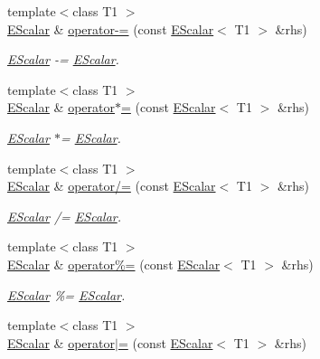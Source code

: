 \begin{DoxyCompactItemize}
{\footnotesize template$<$class T1 $>$ }\\\mbox{\hyperlink{classENSEM_1_1EScalar}{E\+Scalar}} \& \mbox{\hyperlink{classENSEM_1_1EScalar_a2ed33688ab765d0e4d15b391b3f61f33}{operator-\/=}} (const \mbox{\hyperlink{classENSEM_1_1EScalar}{E\+Scalar}}$<$ T1 $>$ \&rhs)
\begin{DoxyCompactList}\small\item\em \mbox{\hyperlink{classENSEM_1_1EScalar}{E\+Scalar}} -\/= \mbox{\hyperlink{classENSEM_1_1EScalar}{E\+Scalar}}. \end{DoxyCompactList}\item 
{\footnotesize template$<$class T1 $>$ }\\\mbox{\hyperlink{classENSEM_1_1EScalar}{E\+Scalar}} \& \mbox{\hyperlink{classENSEM_1_1EScalar_aa614bef8258a8ea3c2711c4d7d032c1a}{operator$\ast$=}} (const \mbox{\hyperlink{classENSEM_1_1EScalar}{E\+Scalar}}$<$ T1 $>$ \&rhs)
\begin{DoxyCompactList}\small\item\em \mbox{\hyperlink{classENSEM_1_1EScalar}{E\+Scalar}} $\ast$= \mbox{\hyperlink{classENSEM_1_1EScalar}{E\+Scalar}}. \end{DoxyCompactList}\item 
{\footnotesize template$<$class T1 $>$ }\\\mbox{\hyperlink{classENSEM_1_1EScalar}{E\+Scalar}} \& \mbox{\hyperlink{classENSEM_1_1EScalar_a09524cf0f6f5baf9c421d03df58fe8d6}{operator/=}} (const \mbox{\hyperlink{classENSEM_1_1EScalar}{E\+Scalar}}$<$ T1 $>$ \&rhs)
\begin{DoxyCompactList}\small\item\em \mbox{\hyperlink{classENSEM_1_1EScalar}{E\+Scalar}} /= \mbox{\hyperlink{classENSEM_1_1EScalar}{E\+Scalar}}. \end{DoxyCompactList}\item 
{\footnotesize template$<$class T1 $>$ }\\\mbox{\hyperlink{classENSEM_1_1EScalar}{E\+Scalar}} \& \mbox{\hyperlink{classENSEM_1_1EScalar_ab4bd572c2f331fadf6914f406bce991f}{operator\%=}} (const \mbox{\hyperlink{classENSEM_1_1EScalar}{E\+Scalar}}$<$ T1 $>$ \&rhs)
\begin{DoxyCompactList}\small\item\em \mbox{\hyperlink{classENSEM_1_1EScalar}{E\+Scalar}} \%= \mbox{\hyperlink{classENSEM_1_1EScalar}{E\+Scalar}}. \end{DoxyCompactList}\item 
{\footnotesize template$<$class T1 $>$ }\\\mbox{\hyperlink{classENSEM_1_1EScalar}{E\+Scalar}} \& \mbox{\hyperlink{classENSEM_1_1EScalar_a95469ba3db6456ae2fa0c6d86d082c0a}{operator$\vert$=}} (const \mbox{\hyperlink{classENSEM_1_1EScalar}{E\+Scalar}}$<$ T1 $>$ \&rhs)

\end{DoxyCompactItemize}

